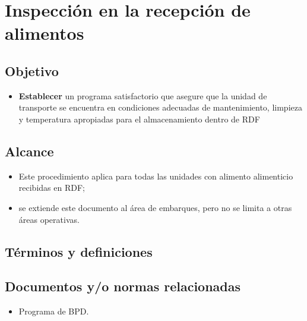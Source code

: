 \thispagestyle{formato-PI}
\renewcommand{\MayorVer}{2}
\renewcommand{\MenorVer}{1}
\renewcommand{\FechaPub}{2023--01}
\renewcommand{\TipoID}{PRO}
\renewcommand{\Titulo}{Inspección en la recepción de alimentos}

\section{\Titulo}
\renewcommand{\Codigo}{\Prog--\thesection--\TipoID}


\subsection{Objetivo}
\begin{itemize}
	\item \textbf{Establecer} un programa satisfactorio que asegure que la unidad de transporte se encuentra en condiciones adecuadas de mantenimiento, limpieza y temperatura apropiadas para el almacenamiento dentro de \gls{RDF}
\end{itemize}

\subsection{Alcance}
\begin{itemize}
	\item Este procedimiento aplica para todas las unidades con alimento alimenticio recibidas en RDF;\@
	\item se extiende este documento al área de embarques, pero no se limita a otras áreas operativas.
\end{itemize}

\subsection{Términos y definiciones}
\begin{description}
\end{description}

\subsection{Documentos y/o normas relacionadas}
\begin{itemize}
	\item Programa de \gls{BPD}.
\end{itemize}


